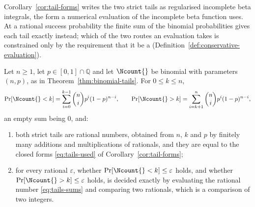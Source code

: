 
Corollary~\ref{cor:tail-forms} writes the two strict tails as regularised
incomplete beta integrals, the form a numerical evaluation of the incomplete
beta function uses. At a rational success probability the finite sum of the
binomial probabilities gives each tail exactly instead; which of the two
routes an evaluation takes is constrained only by the requirement that it be
a 
(Definition~\ref{def:conservative-evaluation}).

\begin{lemma}\label{lem:exact-strict-tails}
Let $n\ge1$, let $p\in[0,1]\cap\mathbb{Q}$ and let $\Ncount{}$ be binomial
with parameters $(n,p)$, as in Theorem~\ref{thm:binomial-tails}. For
$0\le k\le n$,
\begin{equation}\label{eq:tails-sums}
  \Pr[\Ncount{}<k]=\sum_{i=0}^{k-1}\binom{n}{i}p^{i}(1-p)^{n-i},
  \qquad
  \Pr[\Ncount{}>k]=\sum_{i=k+1}^{n}\binom{n}{i}p^{i}(1-p)^{n-i},
\end{equation}
an empty sum being $0$, and:
\begin{enumerate}[label=(\roman*),leftmargin=2.2em]
\item both strict tails are rational numbers, obtained from $n$, $k$ and $p$
by finitely many additions and multiplications of rationals, and they are
equal to the closed forms \eqref{eq:tails-used} of
Corollary~\ref{cor:tail-forms};
\item for every rational $\varepsilon$, whether
$\Pr[\Ncount{}<k]\le\varepsilon$ holds, and whether
$\Pr[\Ncount{}>k]\le\varepsilon$ holds, is decided exactly by evaluating the
rational number \eqref{eq:tails-sums} and comparing two rationals, which is a
comparison of two integers.
\end{enumerate}
\end{lemma}

